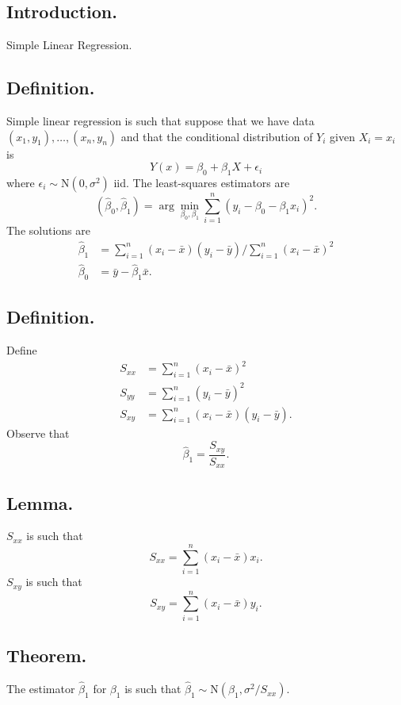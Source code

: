 \documentclass[titlepage]{article}
\begin{document}
\newpage {}

\subsection{Introduction.} Simple Linear Regression.

\subsection{Definition.} Simple linear regression is such that suppose that we have data $(x_{1}, y_{1}), \ldots, (x_{n}, y_{n})$ and that the conditional distribution of $Y_{i}$ given $X_{i} = x_{i}$ is 
$$Y(x) = \beta_{0} + \beta_{1} X + \epsilon_{i}$$
where $\epsilon_{i} \sim \text{N}(0, \sigma^{2})$ iid. The least-squares estimators are 
$$(\hat{\beta}_{0}, \hat{\beta}_{1}) = \arg\min_{\beta_{0}, \beta_{1}}\sum_{i=1}^{n}(y_{i} - \beta_{0} - \beta_{1}x_{i})^{2}.$$
The solutions are 
\begin{align*}
    \hat{\beta}_{1} &= \sum_{i=1}^{n}(x_{i} - \bar{x})(y_{i} - \bar{y}) / \sum_{i=1}^{n}(x_{i} - \bar{x})^{2} \\
    \hat{\beta}_{0} &= \bar{y} - \hat{\beta}_{1}\bar{x}.
\end{align*}

\subsection{Definition.} Define 
\begin{align*}
    S_{xx} &= \sum_{i=1}^{n}(x_{i} - \bar{x})^{2} \\
    S_{yy} &= \sum_{i=1}^{n}(y_{i} - \bar{y})^{2} \\
    S_{xy} &= \sum_{i=1}^{n}(x_{i} - \bar{x})(y_{i} - \bar{y}).
\end{align*}
Observe that 
$$\hat{\beta}_{1} = \frac{S_{xy}}{S_{xx}}.$$

\subsection{Lemma.} $S_{xx}$ is such that 
$$S_{xx} = \sum_{i=1}^{n}(x_{i} - \bar{x})x_{i}.$$
$S_{xy}$ is such that 
$$S_{xy} = \sum_{i=1}^{n}(x_{i} - \bar{x})y_{i}.$$

\subsection{Theorem.} The estimator $\hat{\beta}_{1}$ for $\beta_{1}$ is such that $\hat{\beta}_{1} \sim \text{N}(\beta_{1}, \sigma^{2}/S_{xx})$.
\end{document}
